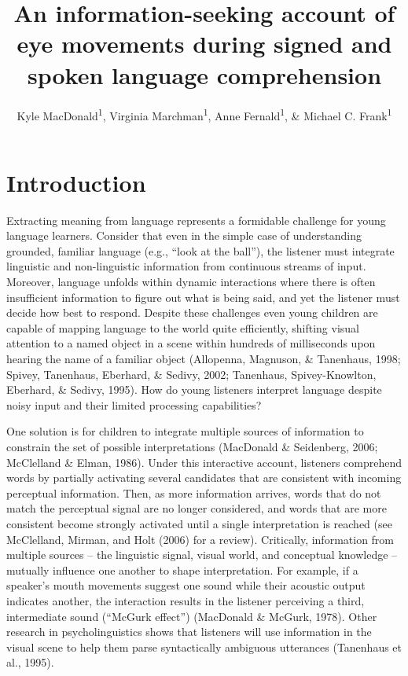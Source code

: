 \documentclass[english,floatsintext,man]{apa6}
\title{An information-seeking account of eye movements during signed and spoken
language comprehension}
\author{Kyle MacDonald\textsuperscript{1}, Virginia Marchman\textsuperscript{1}, Anne Fernald\textsuperscript{1}, \& Michael C. Frank\textsuperscript{1}}
\affiliation{
    \vspace{0.5cm}
          \textsuperscript{1} Stanford University  }
\begin{document}
\maketitle

\setcounter{secnumdepth}{0}



\hypertarget{introduction}{%
\section{Introduction}\label{introduction}}

Extracting meaning from language represents a formidable challenge for
young language learners. Consider that even in the simple case of
understanding grounded, familiar language (e.g., \enquote{look at the
ball}), the listener must integrate linguistic and non-linguistic
information from continuous streams of input. Moreover, language unfolds
within dynamic interactions where there is often insufficient
information to figure out what is being said, and yet the listener must
decide how best to respond. Despite these challenges even young children
are capable of mapping language to the world quite efficiently, shifting
visual attention to a named object in a scene within hundreds of
milliseconds upon hearing the name of a familiar object (Allopenna,
Magnuson, \& Tanenhaus, 1998; Spivey, Tanenhaus, Eberhard, \& Sedivy,
2002; Tanenhaus, Spivey-Knowlton, Eberhard, \& Sedivy, 1995). How do
young listeners interpret language despite noisy input and their limited
processing capabilities?

One solution is for children to integrate multiple sources of
information to constrain the set of possible interpretations (MacDonald
\& Seidenberg, 2006; McClelland \& Elman, 1986). Under this interactive
account, listeners comprehend words by partially activating several
candidates that are consistent with incoming perceptual information.
Then, as more information arrives, words that do not match the
perceptual signal are no longer considered, and words that are more
consistent become strongly activated until a single interpretation is
reached (see McClelland, Mirman, and Holt (2006) for a review).
Critically, information from multiple sources -- the linguistic signal,
visual world, and conceptual knowledge -- mutually influence one another
to shape interpretation. For example, if a speaker's mouth movements
suggest one sound while their acoustic output indicates another, the
interaction results in the listener perceiving a third, intermediate
sound (\enquote{McGurk effect}) (MacDonald \& McGurk, 1978). Other
research in psycholinguistics shows that listeners will use information
in the visual scene to help them parse syntactically ambiguous
utterances (Tanenhaus et al., 1995).
\end{document}
